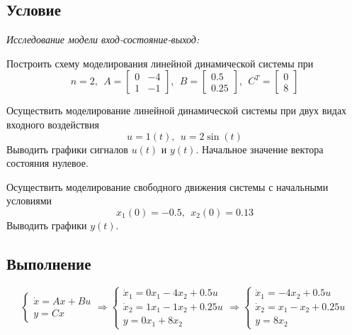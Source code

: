 \documentclass[a4paper, 12pt]{article}
\begin{document}
    \subsection{Условие}
    \textit{Исследование модели вход-состояние-выход:}
    \begin{compactitem}
    \item Построить схему моделирования линейной динамической системы при
    $$n=2,\ \
    A=
    \begin{bmatrix}
        0 & -4\\
        1 & -1
    \end{bmatrix},\ \
    B=
    \begin{bmatrix}
        0.5\\
        0.25
    \end{bmatrix},\ \
    C^T=
    \begin{bmatrix}
        0\\
        8
    \end{bmatrix}$$
    \item Осуществить моделирование линейной динамической системы при двух видах входного воздействия
    $$u=1(t),\ \ u=2\sin{(t)}$$ Выводить графики
    сигналов $u(t)$ и $y(t)$. Начальное значение вектора состояния нулевое.
    \item Осуществить моделирование свободного движения системы с начальными условиями
    $$x_1(0)=-0.5,\ \ x_2(0)=0.13$$ Выводить графики $y(t)$.
    \end{compactitem}


    \subsection{Выполнение}
    $$
    \begin{cases}
        \dot{x}=Ax+Bu\\
        y=Cx
    \end{cases}
    \Rightarrow
    \begin{cases}
    \dot{x}_1=0x_1-4x_2+0.5u\\
    \dot{x}_2=1x_1-1x_2+0.25u\\
    y=0x_1+8x_2
    \end{cases}
    \Rightarrow
    \begin{cases}
        \dot{x}_1=-4x_2+0.5u\\
        \dot{x}_2=x_1-x_2+0.25u\\
        y=8x_2
    \end{cases}
    $$
\end{document}
